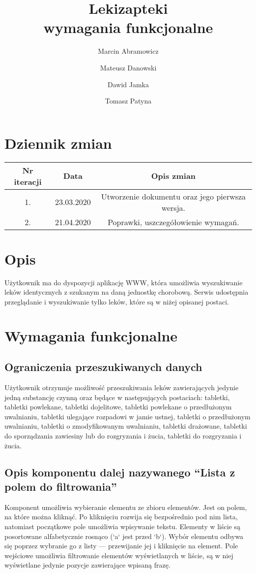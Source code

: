 \documentclass{article}
\title{
Lekizapteki\\
\large wymagania funkcjonalne}
\author{Marcin Abramowicz \and Mateusz Danowski \and Dawid Jamka \and Tomasz Patyna}
\begin{document}
  \setlength{\parindent}{0in}
  \maketitle

  \section{Dziennik zmian}
  \begin{tabular}{|c|c|c|}
    Nr iteracji & Data & Opis zmian \\
    \hline
    1. & 23.03.2020 & Utworzenie dokumentu oraz jego pierwsza wersja. \\
    \hline
    2. & 21.04.2020 & Poprawki, uszczegółowienie wymagań.
  \end{tabular}

  \section{Opis}
  Użytkownik ma do dyspozycji aplikację WWW, która umożliwia wyszukiwanie leków identycznych z szukanym na daną jednostkę chorobową.
  Serwis udostępnia przeglądanie i wyszukiwanie tylko leków, które są w niżej opisanej postaci.

  \section{Wymagania funkcjonalne}
    \subsection{Ograniczenia przeszukiwanych danych}
    Użytkownik otrzymuje możliwość przeszukiwania leków zawierających jedynie jedną substancję czynną oraz będące w następujących postaciach:
    tabletki,
    tabletki powlekane,
    tabletki dojelitowe,
    tabletki powlekane o przedłużonym uwalnianiu,
    tabletki ulegające rozpadowi w jamie ustnej,
    tabletki o przedłużonym uwalnianiu,
    tabletki o zmodyfikowanym uwalnianiu,
    tabletki drażowane,
    tabletki do sporządzania zawiesiny lub do rozgryzania i żucia,
    tabletki do rozgryzania i żucia.

    \subsection{Opis komponentu dalej nazywanego ``Lista z polem do filtrowania''}
    Komponent umożliwia wybieranie elementu ze zbioru elementów.
    Jest on polem, na które można kliknąć.
    Po kliknięciu rozwija się bezpośrednio pod nim lista, natomiast początkowe pole umożliwia wpisywanie tekstu.
    Elementy w liście są posortowane alfabetycznie rosnąco (`a` jest przed `b`).
    Wybór elementu odbywa się poprzez wybranie go z listy — przewijanie jej i kliknięcie na element.
    Pole wejściowe umożliwia filtrowanie elementów wyświetlanych w liście, są w niej wyświetlane jedynie pozycje zawierające wpisaną frazę.
\end{document}
